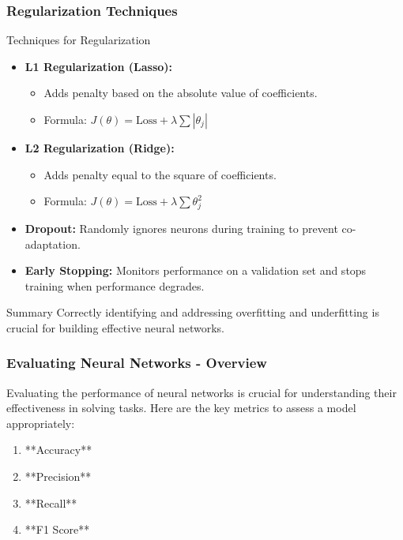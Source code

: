 \documentclass[aspectratio=169]{beamer}
\begin{document}
\begin{frame}[fragile]
    \frametitle{Regularization Techniques}

    \begin{block}{Techniques for Regularization}
        \begin{itemize}
            \item \textbf{L1 Regularization (Lasso):} 
            \begin{itemize}
                \item Adds penalty based on the absolute value of coefficients.
                \item Formula: \( J(\theta) = \text{Loss} + \lambda \sum |\theta_j| \)
            \end{itemize}
            \item \textbf{L2 Regularization (Ridge):}
            \begin{itemize}
                \item Adds penalty equal to the square of coefficients.
                \item Formula: \( J(\theta) = \text{Loss} + \lambda \sum \theta_j^2 \)
            \end{itemize}
            \item \textbf{Dropout:} Randomly ignores neurons during training to prevent co-adaptation.
            \item \textbf{Early Stopping:} Monitors performance on a validation set and stops training when performance degrades.
        \end{itemize}
    \end{block}

    \begin{block}{Summary}
        Correctly identifying and addressing overfitting and underfitting is crucial for building effective neural networks.
    \end{block}
\end{frame}

\begin{frame}[fragile]
  \frametitle{Evaluating Neural Networks - Overview}
  Evaluating the performance of neural networks is crucial for understanding their effectiveness in solving tasks. Here are the key metrics to assess a model appropriately:

  \begin{enumerate}
      \item **Accuracy**
      \item **Precision**
      \item **Recall**
      \item **F1 Score**
  \end{enumerate}
\end{frame}
\end{document}
